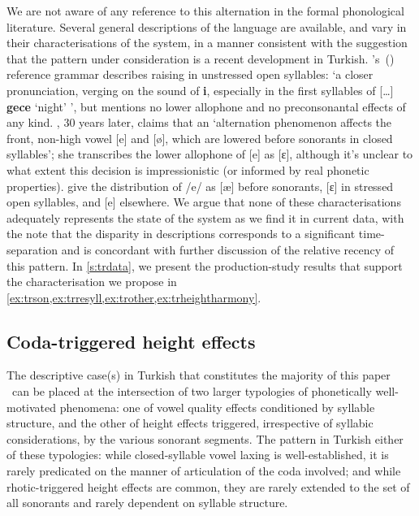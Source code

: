 We are not aware of any reference to this alternation in the formal phonological literature. Several general descriptions of the language are available, and vary in their characterisations of the system, in a manner consistent with the suggestion that the pattern under consideration is a recent development in Turkish. \citeauthor{Lewis1967}'s\ (\citeyear[14]{Lewis1967}) reference grammar describes raising in unstressed open syllables: `a closer pronunciation, verging on the sound of {\bf i}, especially in the first syllables of [\ldots] {\bf gece} `night' ', but mentions no lower allophone and no preconsonantal effects of any kind. \citet[512]{Kornfilt1997}, 30 years later, claims that an `alternation phenomenon affects the front, non-high vowel [e] and [ø], which are lowered before sonorants in closed syllables'; she transcribes the lower allophone of [e] as [ɛ], although it's unclear to what extent this decision is impressionistic (or informed by real phonetic properties). \citet{Goksel2005} give the distribution of /e/ as [æ] before sonorants, [ɛ] in stressed open syllables, and [e] elsewhere. We argue that none of these characterisations adequately represents the state of the system as we find it in current data, with the note that the disparity in descriptions corresponds to a significant time-separation and is concordant with further discussion of the relative recency of this pattern. In \cref{s:trdata}, we present the production-study results that support the characterisation we propose in \cref{ex:trson,ex:trresyll,ex:trother,ex:trheightharmony}.



\subsection{Coda-triggered height effects}\label{ss:coda_effects}

The descriptive case(s) in Turkish that constitutes the majority of this paper \ can be placed at the intersection of two larger typologies of phonetically well-motivated phenomena: one of vowel quality effects conditioned by syllable structure, and the other of height effects triggered, irrespective of syllabic considerations, by the various sonorant segments. The pattern in Turkish  either of these typologies: while closed-syllable vowel laxing is well-established, it is rarely predicated on the manner of articulation of the coda involved; and while rhotic-triggered height effects are common, they are rarely extended to the set of all sonorants and rarely dependent on syllable structure.

